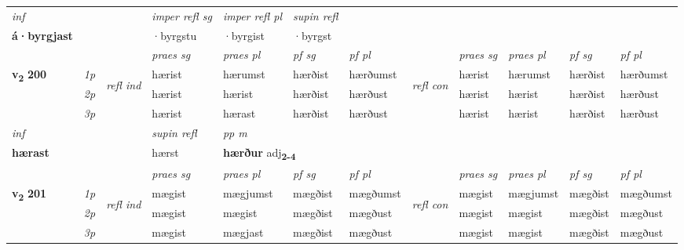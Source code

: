\begin{longtable}[l]{X>{\footnotesize\itshape}llXXXXlXXXX}
   {\textit{inf}} & &   & \textit{imper refl sg} & \textit{imper refl pl}   & \textit{supin refl}  \\*
  {\textbf{á\allowbreak ·byrgjast}} & &   & ·byrgstu & ·byrgist   & ·byrgst  \\*

\midrule

 & &   & \textit{praes sg}  & \textit{praes pl}    & \textit{ pf sg} & \textit{pf pl} & & \textit{praes sg}  & \textit{praes pl}    & \textit{pf sg} & \textit{pf pl }  \\ \cmidrule{4-7} \cmidrule{9-12}
 \multirow{2}{*}{{{\textbf{v{\textsubscript{2}}} \Large{\textbf{200}}}}}  & 1p & \multirow{3}{*}{\begin{turn}{90}\textit{refl ind}\end{turn}}  & hærist & hærumst & hærðist & hærðumst & \multirow{3}{*}{\begin{turn}{90}\textit{refl con}\end{turn}}  &hærist & hærumst & hærðist & hærðumst \\*
 & 2p &  & hærist & hærist & hærðist & hærðust & &hærist & hærist & hærðist & hærðust \\*
 & 3p  & & hærist & hærast & hærðist & hærðust & & hærist & hærist& hærðist & hærðust \\*
\cmidrule{4-7} \cmidrule{9-12}

   {\textit{inf}} & &       & \textit{supin refl} & \textit{pp m} \\*
  {\textbf{hærast}} & &       & hærst & \multicolumn{2}{l}{\textbf{hærður} adj\textbf{\textsubscript{2-4}}} \\*

\midrule

 & &   & \textit{praes sg}  & \textit{praes pl}    & \textit{ pf sg} & \textit{pf pl} & & \textit{praes sg}  & \textit{praes pl}    & \textit{pf sg} & \textit{pf pl }  \\ \cmidrule{4-7} \cmidrule{9-12}
 \multirow{2}{*}{{{\textbf{v{\textsubscript{2}}} \Large{\textbf{201}}}}}  & 1p & \multirow{3}{*}{\begin{turn}{90}\textit{refl ind}\end{turn}}  & mægist & mægjumst & mægðist & mægðumst & \multirow{3}{*}{\begin{turn}{90}\textit{refl con}\end{turn}}  &mægist & mægjumst & mægðist & mægðumst \\*
 & 2p &  & mægist & mægist & mægðist & mægðust & &mægist & mægist & mægðist & mægðust \\*
 & 3p  & & mægist & mægjast & mægðist & mægðust & & mægist & mægist& mægðist & mægðust \\*
\cmidrule{4-7} \cmidrule{9-12}


\end{longtable}
